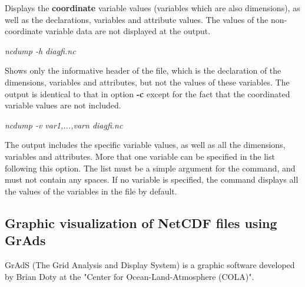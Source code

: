 \noindent
Displays the {\bf coordinate} variable values (variables which are also
dimensions), as well as the declarations, variables and attribute values.
The values of the non-coordinate variable data are not displayed at
the output.

\begin{center}
{\it ncdump -h diagfi.nc}
\end{center}

\noindent
Shows only the informative header of the file, which is the declaration
of the dimensions, variables and attributes, but not the values of these
variables. The output is identical to that in option {\bf -c} except for
the fact that the coordinated variable values are not included.

\begin{center}
{\it ncdump -v var1,...,varn diagfi.nc}
\end{center}

\noindent
The output includes the specific variable values,
as well as all the dimensions, variables and attributes.
More that one variable can be specified in the list following this option.
The list must be a simple argument for the command, and must not contain any
spaces. If no variable is specified, the command displays all the values of
the variables in the file by default.  


\subsection{Graphic visualization of NetCDF files using GrAds}

GrAdS (The Grid Analysis and Display System) is a graphic software developed
by Brian Doty at the "Center for Ocean-Land-Atmosphere (COLA)".

